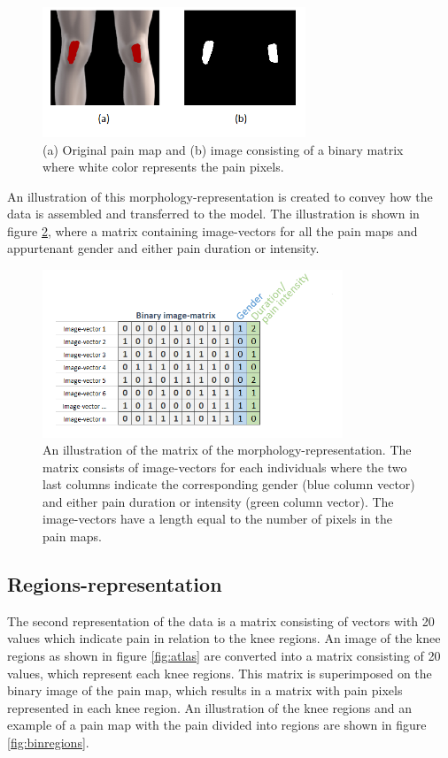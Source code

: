 \begin{figure} [H]
\centering
\includegraphics[width=0.7\textwidth]{figures/cropbin7}
\caption{(a) Original pain map and (b) image consisting of a binary matrix where white color represents the pain pixels.}
\label{fig:cropbin7}
\end{figure}

\noindent
An illustration of this morphology-representation is created to convey how the data is assembled and transferred to the model. The illustration is shown in figure \ref{fig:binmatrix}, where a matrix containing image-vectors for all the pain maps and appurtenant gender and either pain duration or intensity.

\begin{figure} [H]
\centering
\includegraphics[width=0.8\textwidth]{figures/binaryimagematrix}
\caption{An illustration of the matrix of the morphology-representation. The matrix consists of image-vectors for each individuals where the two last columns indicate the corresponding gender (blue column vector) and either pain duration or intensity (green column vector). The image-vectors have a length equal to the number of pixels in the pain maps.}
\label{fig:binmatrix}
\end{figure}


\subsection{Regions-representation}
The second representation of the data is a matrix consisting of vectors with 20 values which indicate pain in relation to the knee regions.
An image of the knee regions as shown in figure \ref{fig:atlas} are converted into a matrix consisting of 20 values, which represent each knee regions. This matrix is superimposed on the binary image of the pain map, which results in a matrix with pain pixels represented in each knee region. 
An illustration of the knee regions and an example of a pain map with the pain divided into regions are shown in figure \ref{fig:binregions}.

